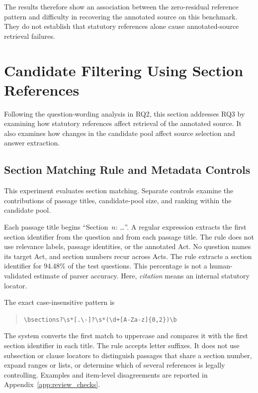\documentclass[pdflatex,sn-basic]{sn-jnl}%
\theoremstyle{thmstyleone}%
\theoremstyle{thmstyletwo}%
\theoremstyle{thmstylethree}%
\begin{document}
The results therefore show an association between the zero-residual reference
pattern and difficulty in recovering the annotated source on this benchmark.
They do not establish that statutory references alone cause annotated-source
retrieval failures.

\FloatBarrier



\section{Candidate Filtering Using Section References}
\label{sec:citation_rq}

Following the question-wording analysis in RQ2, this section addresses RQ3
by examining how statutory references affect retrieval of the annotated
source. It also examines how changes in the candidate pool affect source
selection and answer extraction.

\subsection{Section Matching Rule and Metadata Controls}
\label{sec:citation_aware}

This experiment evaluates section matching. Separate controls examine the
contributions of passage titles, candidate-pool size, and ranking within the
candidate pool.

Each passage title begins ``Section~$n$: \ldots''. A regular expression
extracts the first section identifier from the question and from each passage
title. The rule does not use relevance labels, passage identities, or the
annotated Act. No question names its target Act, and section numbers recur
across Acts. The rule extracts a section identifier for 94.48\% of the test
questions. This percentage is not a human-validated estimate of parser
accuracy. Here, \emph{citation} means an internal statutory locator.

The exact case-insensitive pattern is
\begin{quote}\small
\verb|\bsections?\s*[.\-]?\s*(\d+[A-Za-z]{0,2})\b|
\end{quote}
The system converts the first match to uppercase and compares it with the
first section identifier in each title. The rule accepts letter suffixes.
It does not use subsection or clause locators to distinguish passages that
share a section number, expand ranges or lists, or determine which of several
references is legally controlling. Examples and item-level disagreements are
reported in Appendix~\ref{app:review_checks}.
\end{document}
